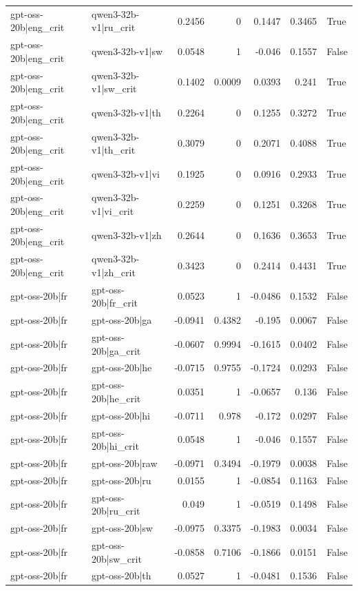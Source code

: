 \begin{table}
\begin{tabular}{l l r r r r l}
gpt-oss-20b|eng_crit & qwen3-32b-v1|ru_crit & 0.2456 & 0 & 0.1447 & 0.3465 & True \\
gpt-oss-20b|eng_crit & qwen3-32b-v1|sw & 0.0548 & 1 & -0.046 & 0.1557 & False \\
gpt-oss-20b|eng_crit & qwen3-32b-v1|sw_crit & 0.1402 & 0.0009 & 0.0393 & 0.241 & True \\
gpt-oss-20b|eng_crit & qwen3-32b-v1|th & 0.2264 & 0 & 0.1255 & 0.3272 & True \\
gpt-oss-20b|eng_crit & qwen3-32b-v1|th_crit & 0.3079 & 0 & 0.2071 & 0.4088 & True \\
gpt-oss-20b|eng_crit & qwen3-32b-v1|vi & 0.1925 & 0 & 0.0916 & 0.2933 & True \\
gpt-oss-20b|eng_crit & qwen3-32b-v1|vi_crit & 0.2259 & 0 & 0.1251 & 0.3268 & True \\
gpt-oss-20b|eng_crit & qwen3-32b-v1|zh & 0.2644 & 0 & 0.1636 & 0.3653 & True \\
gpt-oss-20b|eng_crit & qwen3-32b-v1|zh_crit & 0.3423 & 0 & 0.2414 & 0.4431 & True \\
gpt-oss-20b|fr & gpt-oss-20b|fr_crit & 0.0523 & 1 & -0.0486 & 0.1532 & False \\
gpt-oss-20b|fr & gpt-oss-20b|ga & -0.0941 & 0.4382 & -0.195 & 0.0067 & False \\
gpt-oss-20b|fr & gpt-oss-20b|ga_crit & -0.0607 & 0.9994 & -0.1615 & 0.0402 & False \\
gpt-oss-20b|fr & gpt-oss-20b|he & -0.0715 & 0.9755 & -0.1724 & 0.0293 & False \\
gpt-oss-20b|fr & gpt-oss-20b|he_crit & 0.0351 & 1 & -0.0657 & 0.136 & False \\
gpt-oss-20b|fr & gpt-oss-20b|hi & -0.0711 & 0.978 & -0.172 & 0.0297 & False \\
gpt-oss-20b|fr & gpt-oss-20b|hi_crit & 0.0548 & 1 & -0.046 & 0.1557 & False \\
gpt-oss-20b|fr & gpt-oss-20b|raw & -0.0971 & 0.3494 & -0.1979 & 0.0038 & False \\
gpt-oss-20b|fr & gpt-oss-20b|ru & 0.0155 & 1 & -0.0854 & 0.1163 & False \\
gpt-oss-20b|fr & gpt-oss-20b|ru_crit & 0.049 & 1 & -0.0519 & 0.1498 & False \\
gpt-oss-20b|fr & gpt-oss-20b|sw & -0.0975 & 0.3375 & -0.1983 & 0.0034 & False \\
gpt-oss-20b|fr & gpt-oss-20b|sw_crit & -0.0858 & 0.7106 & -0.1866 & 0.0151 & False \\
gpt-oss-20b|fr & gpt-oss-20b|th & 0.0527 & 1 & -0.0481 & 0.1536 & False \\

\end{tabular}
\end{table}

